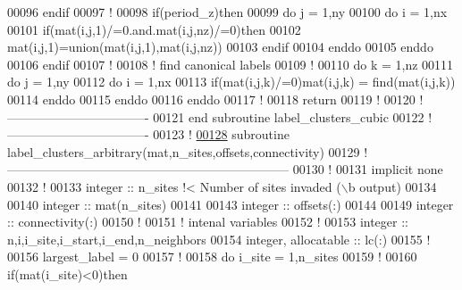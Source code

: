 \begin{DoxyCode}
00096     \textcolor{keyword}{endif}
00097     \textcolor{comment}{!}
00098     \textcolor{keyword}{if}(period\_z)\textcolor{keyword}{then}
00099        \textcolor{keyword}{do} j = 1,ny
00100           \textcolor{keyword}{do} i = 1,nx
00101              \textcolor{keyword}{if}(mat(i,j,1)/=0.and.mat(i,j,nz)/=0)\textcolor{keyword}{then}
00102                 mat(i,j,1)=union(mat(i,j,1),mat(i,j,nz))
00103              \textcolor{keyword}{endif}
00104           \textcolor{keyword}{enddo}
00105        \textcolor{keyword}{enddo}
00106     \textcolor{keyword}{endif}
00107     \textcolor{comment}{!}
00108     \textcolor{comment}{! find canonical labels}
00109     \textcolor{comment}{!}
00110     \textcolor{keyword}{do} k = 1,nz
00111        \textcolor{keyword}{do} j = 1,ny
00112           \textcolor{keyword}{do} i = 1,nx
00113              \textcolor{keyword}{if}(mat(i,j,k)/=0)mat(i,j,k) = find(mat(i,j,k))
00114           \textcolor{keyword}{enddo}
00115        \textcolor{keyword}{enddo}
00116     \textcolor{keyword}{enddo}
00117     \textcolor{comment}{!}
00118     return
00119     \textcolor{comment}{!}
00120   \textcolor{comment}{!----------------------------------}
00121 \textcolor{keyword}{  end subroutine label\_clusters\_cubic}
00122   \textcolor{comment}{!----------------------------------}
00123   \textcolor{comment}{!}
\hypertarget{module__label__clusters_8f90_source_l00128}{}\hyperlink{classmodule__label__clusters_a9b73572fdcc3c709bcd6b67e343b7263}{00128}   \textcolor{keyword}{subroutine }label\_clusters\_arbitrary(mat,n\_sites,offsets,connectivity)
00129   \textcolor{comment}{!--------------------------------------------------------------------}
00130     \textcolor{comment}{!}
00131     \textcolor{keyword}{implicit none}
00132     \textcolor{comment}{!}
00133     \textcolor{keywordtype}{integer} :: n\_sites \textcolor{comment}{!< Number of sites invaded (\(\backslash\)b output)}
00134 
00140     \textcolor{keywordtype}{integer} :: mat(n\_sites)
00141 
00143     \textcolor{keywordtype}{integer} :: offsets(:)
00144 
00149     \textcolor{keywordtype}{integer} :: connectivity(:)
00150     \textcolor{comment}{!}
00151     \textcolor{comment}{! intenal variables}
00152     \textcolor{comment}{!}
00153     \textcolor{keywordtype}{integer} :: n,i,i\_site,i\_start,i\_end,n\_neighbors
00154     \textcolor{keywordtype}{integer}, \textcolor{keywordtype}{allocatable} :: lc(:)
00155     \textcolor{comment}{!}
00156     largest\_label = 0
00157     \textcolor{comment}{!}
00158     \textcolor{keyword}{do} i\_site = 1,n\_sites
00159        \textcolor{comment}{!}
00160        \textcolor{keyword}{if}(mat(i\_site)<0)\textcolor{keyword}{then}

\end{DoxyCode}
